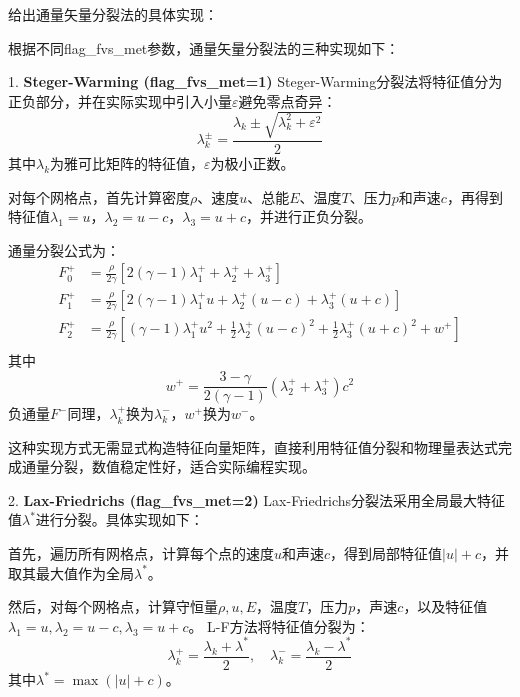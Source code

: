 \documentclass[12pt,a4paper]{article}
\begin{document}
给出通量矢量分裂法的具体实现：

根据不同flag\_fvs\_met参数，通量矢量分裂法的三种实现如下：

1. \textbf{Steger-Warming (flag\_fvs\_met=1)}  
    Steger-Warming分裂法将特征值分为正负部分，并在实际实现中引入小量$\varepsilon$避免零点奇异：
    $$
    \lambda_k^{\pm} = \frac{\lambda_k \pm \sqrt{\lambda_k^2 + \varepsilon^2}}{2}
    $$
    其中$\lambda_k$为雅可比矩阵的特征值，$\varepsilon$为极小正数。

    对每个网格点，首先计算密度$\rho$、速度$u$、总能$E$、温度$T$、压力$p$和声速$c$，再得到特征值$\lambda_1 = u$，$\lambda_2 = u-c$，$\lambda_3 = u+c$，并进行正负分裂。

    通量分裂公式为：
    \begin{align*}
    F^+_0 &= \frac{\rho}{2\gamma} \left[2(\gamma-1)\lambda_1^+ + \lambda_2^+ + \lambda_3^+\right] \\
    F^+_1 &= \frac{\rho}{2\gamma} \left[2(\gamma-1)\lambda_1^+ u + \lambda_2^+(u-c) + \lambda_3^+(u+c)\right] \\
    F^+_2 &= \frac{\rho}{2\gamma} \left[(\gamma-1)\lambda_1^+ u^2 + \frac{1}{2}\lambda_2^+(u-c)^2 + \frac{1}{2}\lambda_3^+(u+c)^2 + w^+\right] \\
    \end{align*}
    其中
    $$
    w^+ = \frac{3-\gamma}{2(\gamma-1)}(\lambda_2^+ + \lambda_3^+)c^2
    $$
    负通量$F^-$同理，$\lambda_k^+$换为$\lambda_k^-$，$w^+$换为$w^-$。

    这种实现方式无需显式构造特征向量矩阵，直接利用特征值分裂和物理量表达式完成通量分裂，数值稳定性好，适合实际编程实现。

2. \textbf{Lax-Friedrichs (flag\_fvs\_met=2)}  
    Lax-Friedrichs分裂法采用全局最大特征值$\lambda^*$进行分裂。具体实现如下：

    首先，遍历所有网格点，计算每个点的速度$u$和声速$c$，得到局部特征值$|u|+c$，并取其最大值作为全局$\lambda^*$。

    然后，对每个网格点，计算守恒量$\rho, u, E$，温度$T$，压力$p$，声速$c$，以及特征值$\lambda_1=u, \lambda_2=u-c, \lambda_3=u+c$。  
    L-F方法将特征值分裂为：
    $$
    \lambda_k^+ = \frac{\lambda_k + \lambda^*}{2}, \quad
    \lambda_k^- = \frac{\lambda_k - \lambda^*}{2}
    $$
    其中$\lambda^* = \max(|u|+c)$。
\end{document}
